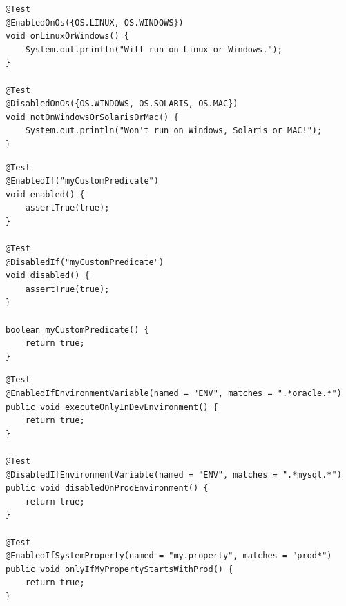 \begin{verbatim}
@Test
@EnabledOnOs({OS.LINUX, OS.WINDOWS})
void onLinuxOrWindows() {
    System.out.println("Will run on Linux or Windows.");
}

@Test
@DisabledOnOs({OS.WINDOWS, OS.SOLARIS, OS.MAC})
void notOnWindowsOrSolarisOrMac() {
    System.out.println("Won't run on Windows, Solaris or MAC!");
}
\end{verbatim}

\begin{verbatim}
@Test
@EnabledIf("myCustomPredicate")
void enabled() {
    assertTrue(true);
}

@Test
@DisabledIf("myCustomPredicate")
void disabled() {
    assertTrue(true);
}

boolean myCustomPredicate() {
    return true;
}
\end{verbatim}

\begin{verbatim}
@Test
@EnabledIfEnvironmentVariable(named = "ENV", matches = ".*oracle.*")
public void executeOnlyInDevEnvironment() {
    return true;
}

@Test
@DisabledIfEnvironmentVariable(named = "ENV", matches = ".*mysql.*")
public void disabledOnProdEnvironment() {
    return true;
}

@Test
@EnabledIfSystemProperty(named = "my.property", matches = "prod*")
public void onlyIfMyPropertyStartsWithProd() {
    return true;
}
\end{verbatim}
